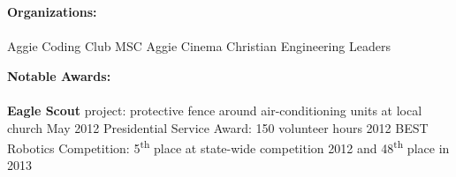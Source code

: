 \documentclass[12pt]{article}
\newcommand{\upspace}{\vspace{0px}}
\newcommand{\zzz}[1]{\upspace \0 \textbf{#1} \\ \vspace{-0.7\baselineskip} \hrulefill \vspace{-2px} \\ }
\newcommand{\aaa}{\upspace \1}
\newcommand{\bbb}{\upspace \2}
\begin{document}
\begin{flushleft}
\begin{outline}[compactitem]
\zzz{Organizations:}
	\aaa Aggie Coding Club \hfill{}\hspace{1px} MSC Aggie Cinema \hfill{}\hspace{1px} Christian Engineering Leaders

\zzz{Notable Awards:}
	\aaa \textbf{Eagle Scout} project: protective fence around air-conditioning units at local church \hfill May 2012
	\aaa Presidential Service Award: 150 volunteer hours \hfill 2012
	\aaa BEST Robotics Competition: 5\textsuperscript{th} place at state-wide competition 2012 and 48\textsuperscript{th} place in 2013

\end{outline}
\end{flushleft}
\end{document}
